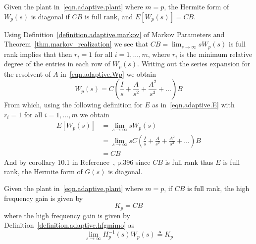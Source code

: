%
%

\begin{thm-dan}\label{thm.CB}
  Given the plant in~\eqref{eqn.adaptive.plant} where $m=p$, the Hermite form of $W_{p}(s)$ is diagonal if $CB$ is full rank, and $E[W_{p}(s)]=CB$.
\end{thm-dan}

\begin{proof-dan}
  Using Definition~\ref{definition.adaptive.markov} of Markov Parameters and Theorem~\ref{thm.markov_realization} we see that $CB=\lim_{s\rightarrow\infty}sW_{p}(s)$ is full rank implies that then $r_{i}=1$ for all $i=1,\dots,m$, where $r_{i}$ is the minimum relative degree of the entries in each row of $W_{p}(s)$.
  Writing out the series expansion for the resolvent of $A$ in~\eqref{eqn.adaptive.Wp} we obtain
  \begin{equation*}
    W_{p}(s)=C\left(\frac{I}{s}+\frac{A}{s^{2}}+\frac{A^{2}}{s^{3}}+\dots\right)B
  \end{equation*}
  From which, using the following definition for $E$ as in~\eqref{eqn.adaptive.E} with $r_{i}=1$ for all $i=1,\dots,m$ we obtain
  \begin{align*}
    E[W_{p}(s)]&=\lim_{s\rightarrow\infty}sW_{p}(s) \\
    &=\lim_{s\rightarrow\infty}sC\left(\frac{I}{s}+\frac{A}{s^{2}}+\frac{A^{2}}{s^{3}}+\dots\right)B \\
    &=CB
  \end{align*}
  And by corollary 10.1 in Reference~\cite{narendra.stable.2005}, p.396 since $CB$ is full rank thus $E$ is full rank, the Hermite form of $G(s)$ is diagonal.
\end{proof-dan}

\begin{cor-dan}
  Given the plant in~\eqref{eqn.adaptive.plant} where $m=p$, if $CB$ is full rank, the high frequency gain is given by
  \begin{equation*}
    K_{p}=CB
  \end{equation*}
  where the high frequency gain is given by Definition~\ref{definition.adaptive.hfgmimo} as
  \begin{equation*}
    \lim_{s\rightarrow\infty}H_{p}^{-1}(s)W_{p}(s)\triangleq K_{p}
  \end{equation*}
\end{cor-dan}

